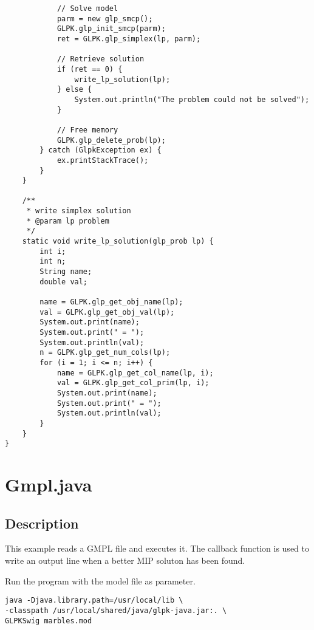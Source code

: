 \documentclass[a4paper,11pt]{report}
\begin{document}
\begin{lstlisting}
            // Solve model
            parm = new glp_smcp();
            GLPK.glp_init_smcp(parm);
            ret = GLPK.glp_simplex(lp, parm);

            // Retrieve solution
            if (ret == 0) {
                write_lp_solution(lp);
            } else {
                System.out.println("The problem could not be solved");
            }

            // Free memory
            GLPK.glp_delete_prob(lp);
        } catch (GlpkException ex) {
            ex.printStackTrace();
        }
    }

    /**
     * write simplex solution
     * @param lp problem
     */
    static void write_lp_solution(glp_prob lp) {
        int i;
        int n;
        String name;
        double val;

        name = GLPK.glp_get_obj_name(lp);
        val = GLPK.glp_get_obj_val(lp);
        System.out.print(name);
        System.out.print(" = ");
        System.out.println(val);
        n = GLPK.glp_get_num_cols(lp);
        for (i = 1; i <= n; i++) {
            name = GLPK.glp_get_col_name(lp, i);
            val = GLPK.glp_get_col_prim(lp, i);
            System.out.print(name);
            System.out.print(" = ");
            System.out.println(val);
        }
    }
}
\end{lstlisting}

\section{Gmpl.java}

\subsection{Description}
This example reads a GMPL file and executes it.
The callback function is used to write an output line
when a better MIP soluton has been found.

Run the program with the model file as parameter.
\begin{verbatim}
java -Djava.library.path=/usr/local/lib \
-classpath /usr/local/shared/java/glpk-java.jar:. \
GLPKSwig marbles.mod
\end{verbatim}
\end{document}
